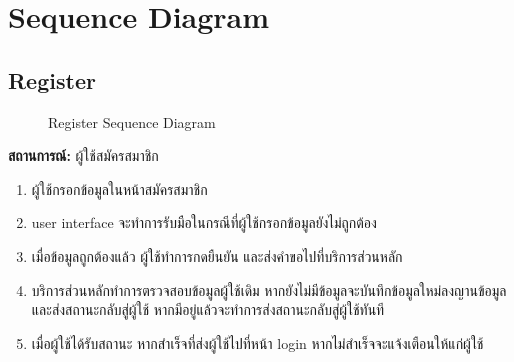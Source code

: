 \section{Sequence Diagram}
\subsection{Register}
\begin{figure}[H]\centering
    \setlength{\fboxrule}{0.2mm} %
    \caption{Register Sequence Diagram}\label{fig:regisSeqDiagram}
\end{figure}
\textbf{สถานการณ์: }ผู้ใช้สมัครสมาชิก
\begin{enumerate}
    \item ผู้ใช้กรอกข้อมูลในหน้าสมัครสมาชิก
    \item user interface จะทำการรับมือในกรณีที่ผู้ใช้กรอกข้อมูลยังไม่ถูกต้อง
    \item เมื่อข้อมูลถูกต้องแล้ว ผู้ใช้ทำการกดยืนยัน และส่งคำขอไปที่บริการส่วนหลัก
    \item บริการส่วนหลักทำการตรวจสอบข้อมูลผู้ใช้เดิม หากยังไม่มีข้อมูลจะบันทึกข้อมูลใหม่ลงญานข้อมูลและส่งสถานะกลับสู่ผู้ใช้ หากมีอยู่แล้วจะทำการส่งสถานะกลับสู่ผู้ใช้ทันที
    \item เมื่อผู้ใช้ได้รับสถานะ หากสำเร็จที่ส่งผู้ใช้ไปที่หน้า login หากไม่สำเร็จจะแจ้งเตือนให้แก่ผู้ใช้
\end{enumerate}

